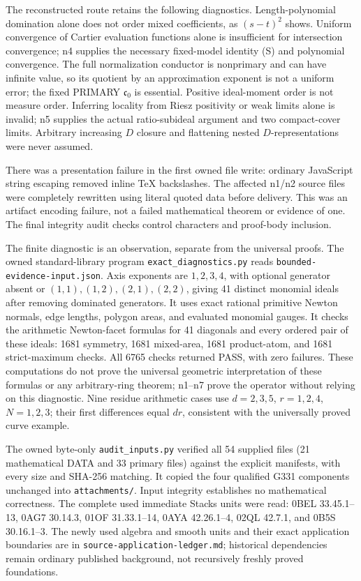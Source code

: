 The reconstructed route retains the following diagnostics. Length-polynomial domination alone does not order mixed coefficients, as \((s-t)^2\) shows. Uniform convergence of Cartier evaluation functions alone is insufficient for intersection convergence; n4 supplies the necessary fixed-model identity (S) and polynomial convergence. The full normalization conductor is nonprimary and can have infinite value, so its quotient by an approximation exponent is not a uniform error; the fixed PRIMARY \(\mathfrak c_0\) is essential. Positive ideal-moment order is not measure order. Inferring locality from Riesz positivity or weak limits alone is invalid; n5 supplies the actual ratio-subideal argument and two compact-cover limits. Arbitrary increasing \(D\) closure and flattening nested \(D\)-representations were never assumed.

There was a presentation failure in the first owned file write: ordinary JavaScript string escaping removed inline TeX backslashes. The affected n1/n2 source files were completely rewritten using literal quoted data before delivery. This was an artifact encoding failure, not a failed mathematical theorem or evidence of one. The final integrity audit checks control characters and proof-body inclusion.

The finite diagnostic is an observation, separate from the universal proofs. The owned standard-library program \texttt{exact\_diagnostics.py} reads \texttt{bounded-evidence-input.json}. Axis exponents are \(1,2,3,4\), with optional generator absent or \((1,1),(1,2),(2,1),(2,2)\), giving 41 distinct monomial ideals after removing dominated generators. It uses exact rational primitive Newton normals, edge lengths, polygon areas, and evaluated monomial gauges. It checks the arithmetic Newton-facet formulas for 41 diagonals and every ordered pair of these ideals: 1681 symmetry, 1681 mixed-area, 1681 product-atom, and 1681 strict-maximum checks. All 6765 checks returned PASS, with zero failures. These computations do not prove the universal geometric interpretation of these formulas or any arbitrary-ring theorem; n1--n7 prove the operator without relying on this diagnostic. Nine residue arithmetic cases use \(d=2,3,5\), \(r=1,2,4\), \(N=1,2,3\); their first differences equal \(dr\), consistent with the universally proved curve example.

The owned byte-only \texttt{audit\_inputs.py} verified all 54 supplied files (21 mathematical DATA and 33 primary files) against the explicit manifests, with every size and SHA-256 matching. It copied the four qualified G331 components unchanged into \texttt{attachments/}. Input integrity establishes no mathematical correctness. The complete used immediate Stacks units were read: 0BEL 33.45.1--13, 0AG7 30.14.3, 01OF 31.33.1--14, 0AYA 42.26.1--4, 02QL 42.7.1, and 0B5S 30.16.1--3. The newly used algebra and smooth units and their exact application boundaries are in \texttt{source-application-ledger.md}; historical dependencies remain ordinary published background, not recursively freshly proved foundations.

